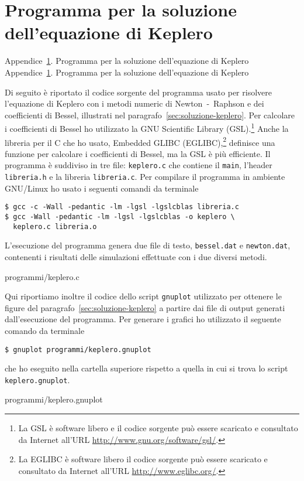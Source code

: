 \cleardoublepage{}
\chapter{Programma per la soluzione dell'equazione di Keplero}
\label{cha:soluzione-keplero}
\markboth%
{Appendice~\ref{cha:soluzione-keplero}. Programma per la soluzione
  dell'equazione di Keplero}%
{Appendice~\ref{cha:soluzione-keplero}. Programma per la soluzione
  dell'equazione di Keplero}

Di seguito è riportato il codice sorgente del programma usato per risolvere
l'equazione di Keplero con i metodi numeric di Newton~-~Raphson e dei
coefficienti di Bessel, illustrati nel
paragrafo~\ref{sec:soluzione-keplero}. Per calcolare i coefficienti di Bessel ho
utilizzato la GNU Scientific Library (GSL).\footnote{La GSL è software libero e
  il codice sorgente può essere scaricato e consultato da Internet all'URL
  \url{http://www.gnu.org/software/gsl/}.} Anche la libreria per il C che ho
usato, Embedded GLIBC (EGLIBC),\footnote{La EGLIBC è software libero il codice
  sorgente può essere scaricato e consultato da Internet all'URL
  \url{http://www.eglibc.org/}.} definisce una funzione per calcolare i
coefficienti di Bessel, ma la GSL è più efficiente. Il programma è suddiviso in
tre file: \verb|keplero.c| che contiene il \verb|main|, l'header
\verb|libreria.h| e la libreria \verb|libreria.c|. Per compilare il programma in
ambiente GNU/Linux ho usato i seguenti comandi da terminale
\begin{verbatim}
$ gcc -c -Wall -pedantic -lm -lgsl -lgslcblas libreria.c
$ gcc -Wall -pedantic -lm -lgsl -lgslcblas -o keplero \
  keplero.c libreria.o
\end{verbatim}
L'esecuzione del programma genera due file di testo, \verb|bessel.dat| e
\verb|newton.dat|, contenenti i risultati delle simulazioni effettuate con i due
diversi metodi.

{programmi/keplero.c}



Qui riportiamo inoltre il codice dello script \verb|gnuplot| utilizzato per
ottenere le figure del paragrafo~\ref{sec:soluzione-keplero} a partire dai file
di output generati dall'esecuzione del programma. Per generare i grafici ho
utilizzato il seguente comando da terminale
\begin{verbatim}
$ gnuplot programmi/keplero.gnuplot
\end{verbatim}
che ho eseguito nella cartella superiore rispetto a quella in cui si trova lo
script \verb|keplero.gnuplot|.

{programmi/keplero.gnuplot}

